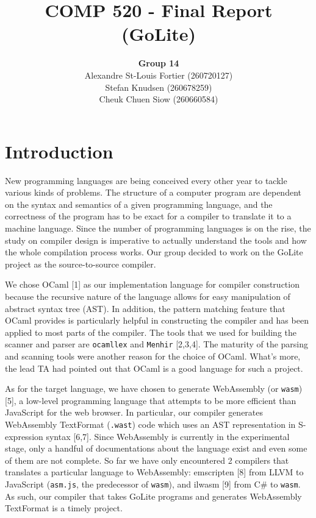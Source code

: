\documentclass{article}
\begin{document}
\title{COMP 520 - Final Report (GoLite)}
\author{
\textbf{Group 14}\\
Alexandre St-Louis Fortier (260720127)\\
Stefan Knudsen (260678259)\\
Cheuk Chuen Siow (260660584)}
\maketitle

\raggedright
\section{Introduction}
New programming languages are being conceived every other year to tackle various kinds of problems. The structure of a computer program are dependent on the syntax and semantics of a given programming language, and the correctness of the program has to be exact for a compiler to translate it to a machine language. Since the number of programming languages is on the rise, the study on compiler design is imperative to actually understand the tools and how the whole compilation process works. Our group decided to work on the GoLite project as the source-to-source compiler.

We chose OCaml [1] as our implementation language for compiler construction because the recursive nature of the language allows for easy manipulation of abstract syntax tree (AST). In addition, the pattern matching feature that OCaml provides is particularly helpful in constructing the compiler and has been applied to most parts of the compiler. The tools that we used for building the scanner and parser are \verb|ocamllex| and \verb|Menhir| [2,3,4]. The maturity of the parsing and scanning tools were another reason for the choice of OCaml. What's more, the lead TA had pointed out that OCaml is a good language for such a project.

As for the target language, we have chosen to generate WebAssembly (or \verb|wasm|) [5], a low-level programming language that attempts to be more efficient than JavaScript for the web browser. In particular, our compiler generates WebAssembly TextFormat (\verb|.wast|) code which uses an AST representation in S-expression syntax [6,7]. Since WebAssembly is currently in the experimental stage, only a handful of documentations about the language exist and even some of them are not complete. So far we have only encountered 2 compilers that translates a particular language to WebAssembly: emscripten [8] from LLVM to JavaScript (\verb|asm.js|, the predecessor of \verb|wasm|), and ilwasm [9] from C\# to \verb|wasm|. As such, our compiler that takes GoLite programs and generates WebAssembly TextFormat is a timely project.
\end{document}
